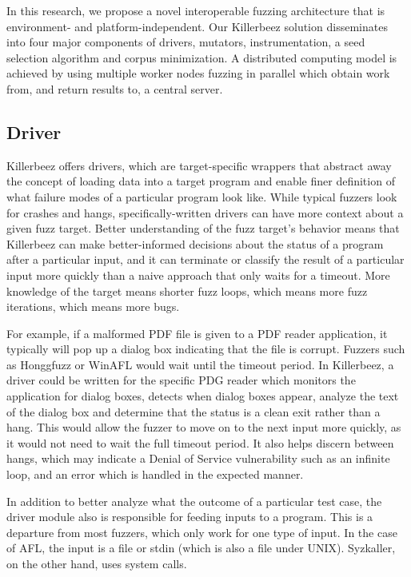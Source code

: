 In this research, we propose a novel interoperable fuzzing architecture that is
environment- and platform-independent. Our Killerbeez solution disseminates
into four major components of drivers, mutators, instrumentation, a seed
selection algorithm and corpus minimization. A distributed computing model is
achieved by using multiple worker nodes fuzzing in parallel which obtain work
from, and return results to, a central server.

\subsection{Driver}
Killerbeez offers drivers, which are target-specific wrappers that abstract
away the concept of loading data into a target program and enable finer
definition of what failure modes of a particular program look like. While
typical fuzzers look for crashes and hangs, specifically-written drivers can
have more context about a given fuzz target.  Better understanding of the fuzz
target's behavior means that Killerbeez can make better-informed decisions
about the status of a program after a particular input, and it can terminate or
classify the result of a particular input more quickly than a naive approach
that only waits for a timeout. More knowledge of the target means shorter fuzz
loops, which means more fuzz iterations, which means more bugs.

For example, if a malformed PDF file is given to a PDF reader application, it
typically will pop up a dialog box indicating that the file is corrupt. Fuzzers
such as Honggfuzz or WinAFL would wait until the timeout period. In Killerbeez,
a driver could be written for the specific PDG reader which monitors the
application for dialog boxes, detects when dialog boxes appear, analyze the
text of the dialog box and determine that the status is a clean exit rather
than a hang.  This would allow the fuzzer to move on to the next input more
quickly, as it would not need to wait the full timeout period.  It also helps
discern between hangs, which may indicate a Denial of Service vulnerability
such as an infinite loop, and an error which is handled in the expected manner.

In addition to better analyze what the outcome of a particular test case, the
driver module also is responsible for feeding inputs to a program.  This is a
departure from most fuzzers, which only work for one type of input.  In the
case of AFL, the input is a file or stdin (which is also a file under UNIX).
Syzkaller\cite{syzkaller}, on the other hand, uses system calls.

